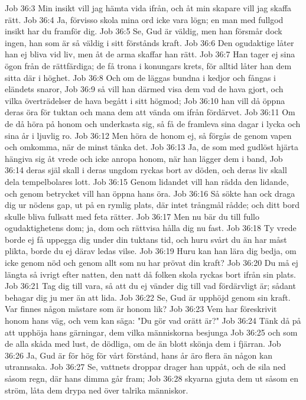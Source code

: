 Job 36:3  Min insikt vill jag hämta vida ifrån, och åt min skapare vill jag skaffa rätt.
Job 36:4  Ja, förvisso skola mina ord icke vara lögn; en man med fullgod insikt har du framför dig.
Job 36:5  Se, Gud är väldig, men han försmår dock ingen, han som är så väldig i sitt förstånds kraft.
Job 36:6  Den ogudaktige låter han ej bliva vid liv, men åt de arma skaffar han rätt.
Job 36:7  Han tager ej sina ögon från de rättfärdiga; de få trona i konungars krets, för alltid låter han dem sitta där i höghet.
Job 36:8  Och om de läggas bundna i kedjor och fångas i eländets snaror,
Job 36:9  så vill han därmed visa dem vad de hava gjort, och vilka överträdelser de hava begått i sitt högmod;
Job 36:10  han vill då öppna deras öra för tuktan och mana dem att vända om ifrån fördärvet.
Job 36:11  Om de då höra på honom och underkasta sig, så få de framleva sina dagar i lycka och sina år i ljuvlig ro.
Job 36:12  Men höra de honom ej, så förgås de genom vapen och omkomma, när de minst tänka det.
Job 36:13  Ja, de som med gudlöst hjärta hängiva sig åt vrede och icke anropa honom, när han lägger dem i band,
Job 36:14  deras själ skall i deras ungdom ryckas bort av döden, och deras liv skall dela tempelbolares lott.
Job 36:15  Genom lidandet vill han rädda den lidande, och genom betrycket vill han öppna hans öra.
Job 36:16  Så sökte han ock draga dig ur nödens gap, ut på en rymlig plats, där intet trångmål rådde; och ditt bord skulle bliva fullsatt med feta rätter.
Job 36:17  Men nu bär du till fullo ogudaktighetens dom; ja, dom och rättvisa hålla dig nu fast.
Job 36:18  Ty vrede borde ej få uppegga dig under din tuktans tid, och huru svårt du än har måst plikta, borde du ej därav ledas vilse.
Job 36:19  Huru kan han lära dig bedja, om icke genom nöd och genom allt som nu har prövat din kraft?
Job 36:20  Du må ej längta så ivrigt efter natten, den natt då folken skola ryckas bort ifrån sin plats.
Job 36:21  Tag dig till vara, så att du ej vänder dig till vad fördärvligt är; sådant behagar dig ju mer än att lida.
Job 36:22  Se, Gud är upphöjd genom sin kraft. Var finnes någon mästare som är honom lik?
Job 36:23  Vem har föreskrivit honom hans väg, och vem kan säga: "Du gör vad orätt är?"
Job 36:24  Tänk då på att upphöja hans gärningar, dem vilka människorna besjunga
Job 36:25  och som de alla skåda med lust, de dödliga, om de än blott skönja dem i fjärran.
Job 36:26  Ja, Gud är för hög för vårt förstånd, hans år äro flera än någon kan utrannsaka.
Job 36:27  Se, vattnets droppar drager han uppåt, och de sila ned såsom regn, där hans dimma går fram;
Job 36:28  skyarna gjuta dem ut såsom en ström, låta dem drypa ned över talrika människor.
